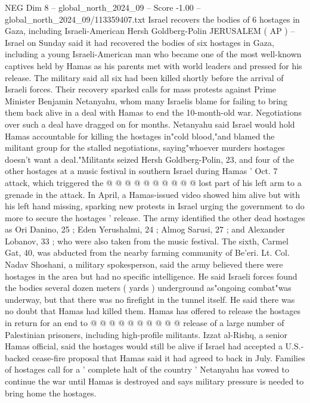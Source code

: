 \begin{textsample}{NEG Dim 8 – global\_north\_2024\_09 – Score -1.00 – global\_north\_2024\_09/113359407.txt}  \label{ex:f8_neg_156}
Israel recovers the bodies of 6 hostages in Gaza, including Israeli-American Hersh Goldberg-Polin JERUSALEM ( AP ) -- Israel on Sunday said it had recovered the bodies of six hostages in Gaza, including a young Israeli-American man who became one of the most well-known captives held by Hamas as his parents met with world leaders and pressed for his release.
The military said all six had been killed shortly before the arrival of Israeli forces.
Their recovery sparked calls for mass protests against Prime Minister Benjamin Netanyahu, whom many Israelis blame for failing to bring them back alive in a deal with Hamas to end the 10-month-old war.
Negotiations over such a deal have dragged on for months.
Netanyahu said Israel would hold Hamas accountable for killing the hostages in"cold blood,"and blamed the militant group for the stalled negotiations, saying"whoever murders hostages doesn't want a deal."Militants seized Hersh Goldberg-Polin, 23, and four of the other hostages at a music festival in southern Israel during Hamas ' Oct. 7 attack, which triggered the @ @ @ @ @ @ @ @ @ @ lost part of his left arm to a grenade in the attack.
In April, a Hamas-issued video showed him alive but with his left hand missing, sparking new protests in Israel urging the government to do more to secure the hostages ' release.
The army identified the other dead hostages as Ori Danino, 25 ; Eden Yerushalmi, 24 ; Almog Sarusi, 27 ; and Alexander Lobanov, 33 ; who were also taken from the music festival.
The sixth, Carmel Gat, 40, was abducted from the nearby farming community of Be'eri.
Lt.
Col.
Nadav Shoshani, a military spokesperson, said the army believed there were hostages in the area but had no specific intelligence.
He said Israeli forces found the bodies several dozen meters ( yards ) underground as"ongoing combat"was underway, but that there was no firefight in the tunnel itself.
He said there was no doubt that Hamas had killed them.
Hamas has offered to release the hostages in return for an end to @ @ @ @ @ @ @ @ @ @ release of a large number of Palestinian prisoners, including high-profile militants.
Izzat al-Rishq, a senior Hamas official, said the hostages would still be alive if Israel had accepted a U.S.- backed cease-fire proposal that Hamas said it had agreed to back in July.
Families of hostages call for a ' complete halt of the country ' Netanyahu has vowed to continue the war until Hamas is destroyed and says military pressure is needed to bring home the hostages.

\end{textsample}
